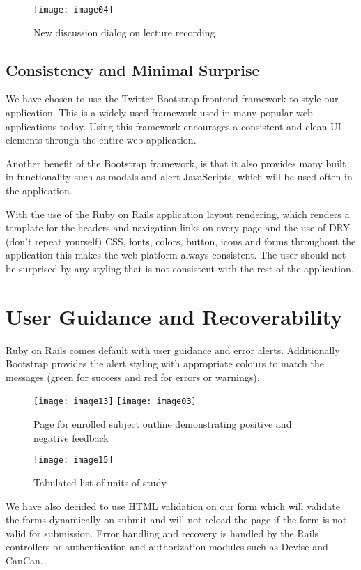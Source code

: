 \documentclass{article}
\begin{document}
\begin{figure}[h!]
\centering
\texttt{[image: image04]}
\caption{New discussion dialog on lecture recording}
\end{figure}

\subsection{Consistency and Minimal Surprise}
We have chosen to use the Twitter Bootstrap frontend framework to style our application. This is a widely used framework used in many popular web applications today. Using this framework encourages a consistent and clean UI elements through the entire web application. 

Another benefit of the Bootstrap framework, is that it also provides many built in functionality such as modals and alert JavaScripts, which will be used often in the application.

With the use of the Ruby on Rails application layout rendering, which renders a template for the headers and navigation links on every page and the use of DRY (don't repeat yourself) CSS, fonts, colors, button, icons and forms throughout the application this makes the web platform always consistent. The user should not be surprised by any styling that is not consistent with the rest of the application.

\clearpage
\section{User Guidance and Recoverability}
Ruby on Rails comes default with user guidance and error alerts. Additionally Bootstrap provides the alert styling with appropriate colours to match the messages (green for success and red for errors or warnings). 

\begin{figure}[h!]
\centering
\texttt{[image: image13]}
\texttt{[image: image03]}
\caption{Page for enrolled subject outline demonstrating positive and negative feedback}
\end{figure}

\begin{figure}[h!]
\centering
\texttt{[image: image15]}
\caption{Tabulated list of units of study}
\end{figure}

\clearpage
We have also decided to use HTML validation on our form which will validate the forms dynamically on submit and will not reload the page if the form is not valid for submission. Error handling and recovery is handled by the Rails controllers or authentication and authorization modules such as Devise and CanCan.
\end{document}
